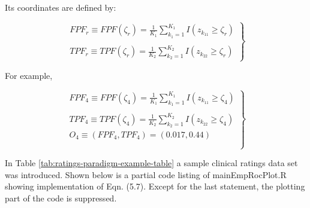 \documentclass[
]{book}
\begin{document}
Its coordinates are defined by:

\begin{equation} 
\left.
\begin{aligned}
FPF_r \equiv FPF\left ( \zeta_r \right )=\frac {1} {K_1} \sum_{k_1=1}^{K_1}I \left ( z_{k_11} \geq  \zeta_r\right ) \\
\\
TPF_r \equiv TPF\left ( \zeta_r \right )=\frac {1} {K_2} \sum_{k_2=1}^{K_2} I\left ( z_{k_22} \geq  \zeta_r\right )
\end{aligned}
\right \}
\label{eq:empirical-operating-point-fpf-tpf-r}
\end{equation}

For example,

\begin{equation} 
\left.
\begin{aligned}
FPF_4 \equiv FPF\left ( \zeta_4 \right )=\frac {1} {K_1} \sum_{k_1=1}^{K_1}I \left ( z_{k_11} \geq  \zeta_4\right ) \\
\\
TPF_4 \equiv TPF\left ( \zeta_4 \right )=\frac {1} {K_2} \sum_{k_2=1}^{K_2} I\left ( z_{k_22} \geq  \zeta_4\right )
\\
O_4 \equiv \left ( FPF_4, TPF_4 \right ) = \left ( 0.017, 0.44 \right )\\
\\
\end{aligned}
\right \}
\label{eq:empirical-operating-point-fpf-tpf-4}
\end{equation}

In Table \ref{tab:ratings-paradigm-example-table} a sample clinical ratings data set was introduced. Shown below is a partial code listing of mainEmpRocPlot.R showing implementation of Eqn. (5.7). Except for the last statement, the plotting part of the code is suppressed.
\end{document}
